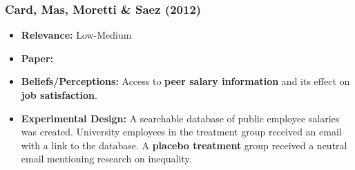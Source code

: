 \documentclass[a4paper, 12pt]{article}
\begin{document}
\subsubsection*{Card, Mas, Moretti \& Saez (2012)}
\begin{itemize}
    \item \textbf{Relevance:} Low-Medium
    \item \textbf{Paper:} 
    \item \textbf{Beliefs/Perceptions:} Access to \textbf{peer salary information} and its effect on \textbf{job satisfaction}.
    \item \textbf{Experimental Design:} A searchable database of public employee salaries was created. University employees in the treatment group received an email with a link to the database. A \textbf{placebo treatment} group received a neutral email mentioning research on inequality.
\end{itemize}
\end{document}

